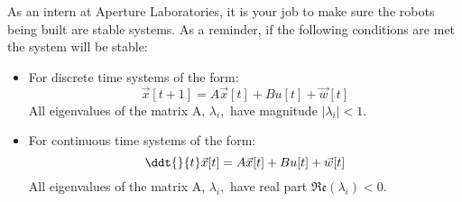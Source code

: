 

As an intern at Aperture Laboratories, it is your job to make sure the robots being built are stable systems.
As a reminder, if the following conditions are met the system will be stable:

\begin{itemize}

\item For discrete time systems of the form:
\begin{equation}
\vec{x}[t+1] = A\vec{x}[t] + Bu[t] + \vec{w}[t]
\end{equation}
All eigenvalues of the matrix A, $\lambda_{i},$ have magnitude $|\lambda_{i}| < 1.$

\item For continuous time systems of the form:
\begin{equation}
\ddt{}{t} \vec{x}[t] = A\vec{x}[t] + Bu[t] + \vec{w}[t]
\end{equation}
All eigenvalues of the matrix A, $\lambda_{i},$ have real part $\mathfrak{Re}(\lambda_{i})< 0.$
\end{itemize}

